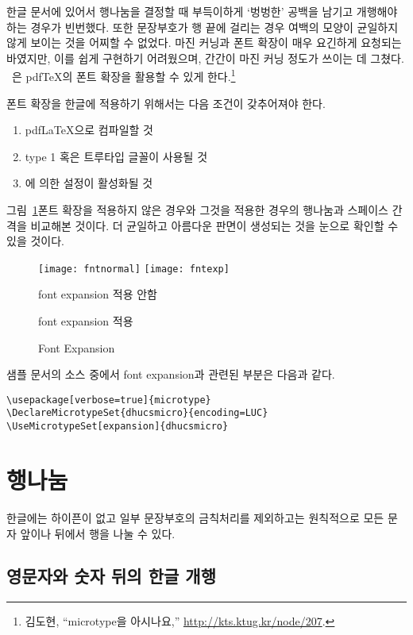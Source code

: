 한글 문서에 있어서 행나눔을 결정할 때 부득이하게 `벙벙한' 공백을
남기고 개행해야 하는 경우가 빈번했다. 또한 문장부호가 행 끝에 걸리는
경우 여백의 모양이 균일하지 않게 보이는 것을 어찌할 수 없었다.
마진 커닝과 폰트 확장이 매우 요긴하게 요청되는 바였지만, 이를 쉽게
구현하기 어려웠으며, 간간이 마진 커닝 정도가 쓰이는 데 그쳤다.
\thispkg~\thisversion 은 pdf\TeX 의 폰트 확장을 활용할 수
있게 한다.\footnote{%
  김도현, ``microtype을 아시나요,'' \url{http://kts.ktug.kr/node/207}.
}

폰트 확장을 한글에 적용하기 위해서는 다음 조건이 갖추어져야 한다.
\begin{enumerate}
\item pdf\LaTeX 으로 컴파일할 것
\item type 1 혹은 트루타입 글꼴이 사용될 것
\item {}에 의한 설정이 활성화될 것
\end{enumerate}
그림~\ref{fig:fontexpansion}\는 폰트 확장을 적용하지 않은 경우와 그것을 적용한 경우의 행나눔과
스페이스 간격을 비교해본 것이다. 더 균일하고 아름다운 판면이 생성되는
것을 눈으로 확인할 수 있을 것이다.

\begin{figure}
\centering
\texttt{[image: fntnormal]}\hfill
\texttt{[image: fntexp]}\\
\parbox{.48\textwidth}{\centerline{\sffamily\small font expansion 적용 안함}}\hfill
\parbox{.48\textwidth}{\centerline{\sffamily\small font expansion 적용}}
\caption{Font Expansion}\label{fig:fontexpansion}
\end{figure}

샘플 문서의 소스 중에서 font expansion과 관련된 부분은 다음과 같다.
\begin{verbatim}
\usepackage[verbose=true]{microtype}
\DeclareMicrotypeSet{dhucsmicro}{encoding=LUC}
\UseMicrotypeSet[expansion]{dhucsmicro}
\end{verbatim}

\section{행나눔}

한글에는 하이픈이 없고 일부 문장부호의 금칙처리를 제외하고는
원칙적으로 모든 문자 앞이나 뒤에서 행을 나눌 수 있다.

\subsection{영문자와 숫자 뒤의 한글 개행}

